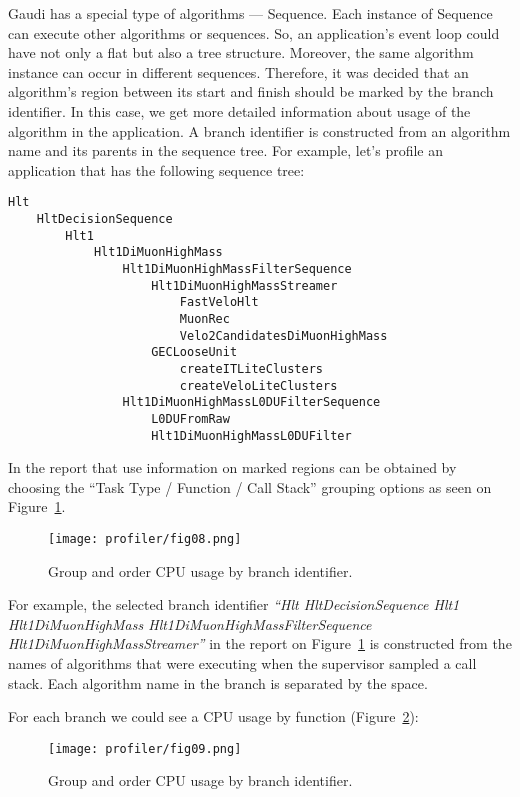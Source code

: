 Gaudi has a special type of algorithms --- Sequence. Each instance of Sequence
can execute other algorithms or sequences. So, an application's event loop
could have not only a flat but also a tree structure. Moreover, the same
algorithm instance can occur in different sequences. Therefore, it was decided
that an algorithm's region between its start and finish should be marked by the
branch identifier. In this case, we get more detailed information about usage
of the algorithm in the application. A branch identifier is constructed from an
algorithm name and its parents in the sequence tree. For example, let's profile
an application that has the following sequence tree:
\begin{verbatim}
Hlt 
    HltDecisionSequence 
        Hlt1 
            Hlt1DiMuonHighMass
                Hlt1DiMuonHighMassFilterSequence
                    Hlt1DiMuonHighMassStreamer
                        FastVeloHlt
                        MuonRec
                        Velo2CandidatesDiMuonHighMass
                    GECLooseUnit
                        createITLiteClusters
                        createVeloLiteClusters
                Hlt1DiMuonHighMassL0DUFilterSequence
                    L0DUFromRaw
                    Hlt1DiMuonHighMassL0DUFilter
\end{verbatim}

In \amp the report that use information on marked regions can be obtained by
choosing the ``Task Type / Function / Call Stack'' grouping options as seen on
Figure~\ref{fig08}.

\begin{figure}[H]
\begin{minipage}{\textwidth}
\texttt{[image: profiler/fig08.png]}
\caption{\label{fig08}Group and order CPU usage by branch identifier.}
\end{minipage}
\end{figure}

For example, the selected branch identifier {\it ``Hlt HltDecisionSequence Hlt1 Hlt1DiMuonHighMass Hlt1DiMuonHighMassFilterSequence Hlt1DiMuonHighMassStreamer''} in the report on Figure~\ref{fig08} is constructed from the names of algorithms that were executing 
when the \amp supervisor sampled a call stack. Each algorithm name in the branch is separated by the space. 

For each branch we could see a CPU usage by function (Figure~\ref{fig09}):

\begin{figure}[H]
\begin{minipage}{\textwidth}
\texttt{[image: profiler/fig09.png]}
\caption{\label{fig09}Group and order CPU usage by branch identifier.}
\end{minipage}
\end{figure}

